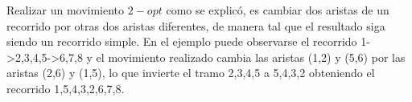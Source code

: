 \begin{figure}[h] 
 \centering
       \label{fig:Movimiento 2-opt1}
    \label{fig:Movimiento 2-opt}
\end{figure}


Realizar un movimiento $2-opt$ como se explicó, es cambiar dos aristas de un recorrido por otras dos aristas diferentes, de manera tal que el resultado siga siendo un recorrido simple.
En el ejemplo puede observarse el recorrido 1->2,3,4,5->6,7,8 y el movimiento realizado cambia las aristas (1,2) y (5,6) por las aristas (2,6) y (1,5), lo que invierte el tramo 2,3,4,5 a 5,4,3,2 obteniendo el recorrido 1,5,4,3,2,6,7,8.
  
